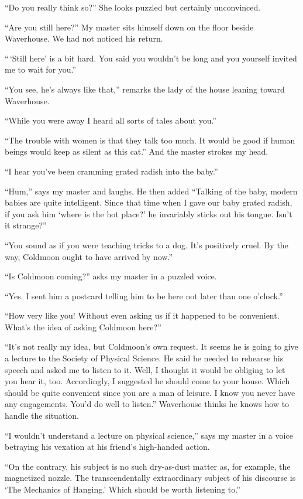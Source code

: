 \documentclass{book}
\begin{document}
``Do you really think so?'' She looks puzzled but certainly unconvinced.

``Are you still here?'' My master sits himself down on the floor beside
Waverhouse. We had not noticed his return.

``\,`Still here' is a bit hard. You said you wouldn't be long and you
yourself invited me to wait for you.''

``You see, he's always like that,'' remarks the lady of the house
leaning toward Waverhouse.

``While you were away I heard all sorts of tales about you.''

``The trouble with women is that they talk too much. It would be good if
human beings would keep as silent as this cat.'' And the master strokes
my head.

``I hear you've been cramming grated radish into the baby.''

``Hum,'' says my master and laughs. He then added ``Talking of the baby,
modern babies are quite intelligent. Since that time when I gave our
baby grated radish, if you ask him `where is the hot place?' he
invariably sticks out his tongue. Isn't it strange?''

``You sound as if you were teaching tricks to a dog. It's positively
cruel. By the way, Coldmoon ought to have arrived by now.''

``Is Coldmoon coming?'' asks my master in a puzzled voice.

``Yes. I sent him a postcard telling him to be here not later than one
o'clock.''

``How very like you! Without even asking us if it happened to be
convenient. What's the idea of asking Coldmoon here?''

``It's not really my idea, but Coldmoon's own request. It seems he is
going to give a lecture to the Society of Physical Science. He said he
needed to rehearse his speech and asked me to listen to it. Well, I
thought it would be obliging to let you hear it, too. Accordingly, I
suggested he should come to your house. Which should be quite convenient
since you are a man of leisure. I know you never have any engagements.
You'd do well to listen.'' Waverhouse thinks he knows how to handle the
situation.

``I wouldn't understand a lecture on physical science,'' says my master
in a voice betraying his vexation at his friend's high-handed action.

``On the contrary, his subject is no such dry-as-dust matter as, for
example, the magnetized nozzle. The transcendentally extraordinary
subject of his discourse is `The Mechanics of Hanging.' Which should be
worth listening to.''
\end{document}
